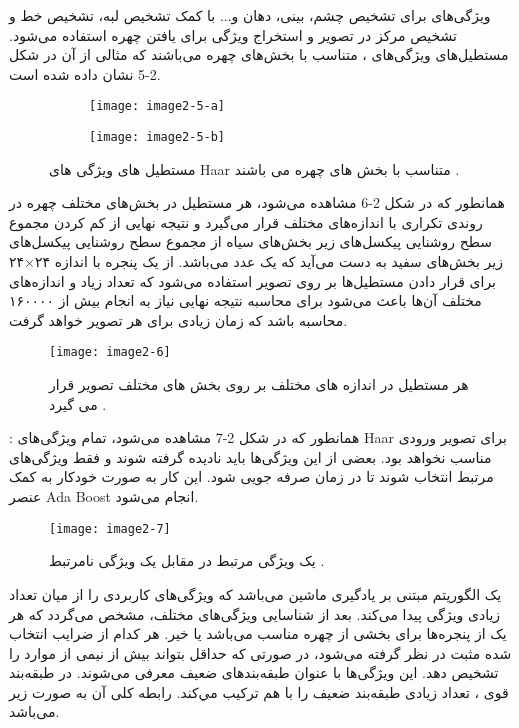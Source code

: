 \noindent
ویژگی‌های‌  برای تشخیص چشم، بینی، دهان و... با کمک تشخیص لبه، تشخیص خط و تشخیص مرکز در تصویر و استخراج ویژگی برای یافتن چهره استفاده می‌شود. مستطیل‌های ویژگی‌های ، متناسب با بخش‌های چهره می‌باشند که مثالی از آن در شکل 2-5 نشان داده شده است.

\begin{figure}
\begin{subfigure}{.5\textwidth}
  \centering
  \texttt{[image: image2-5-a]}
  \label{image2-5-a}
\end{subfigure}
\begin{subfigure}{.5\textwidth}
  \centering
  \texttt{[image: image2-5-b]}
  \label{image2-5-b}
\end{subfigure}
\caption{مستطیل های ویژگی های Haar متناسب با بخش های چهره می باشند \cite{ref1}.}
\label{fig:image2-5}
\end{figure}

\noindent
همانطور که در شکل 2-6 مشاهده می‌شود، هر مستطیل در بخش‌های مختلف چهره در روندی تکراری با اندازه‌های مختلف قرار می‌گیرد و نتیجه نهایی از کم کردن مجموع سطح روشنایی پیکسل‌های زیر بخش‌های سیاه از مجموع سطح روشنایی پیکسل‌های زیر بخش‌های سفید به دست می‌آید که یک عدد می‌باشد. از یک پنجره با اندازه ۲۴×۲۴ برای قرار دادن مستطیل‌ها بر روی تصویر استفاده می‌شود که تعداد زیاد و اندازه‌های مختلف آن‌ها باعث می‌شود برای محاسبه نتیجه نهایی نیاز به انجام بیش از ۱۶۰۰۰۰ محاسبه باشد که زمان زیادی برای هر تصویر خواهد گرفت.

\begin{figure}[h]
\centering
  \texttt{[image: image2-6]}
  \caption{هر مستطیل در اندازه های مختلف بر روی بخش های مختلف تصویر قرار می گیرد \cite{ref1}.}
  \label{image2-6}
\end{figure}

\noindent
{}: 
همانطور که در شکل 2-7 مشاهده می‌شود، تمام ویژگی‌های Haar برای تصویر ورودی مناسب نخواهد بود. بعضی از این ویژگی‌ها باید نادیده گرفته شوند و فقط ویژگی‌های مرتبط انتخاب شوند تا در زمان صرفه جویی شود. این کار به صورت خودکار به کمک عنصر Ada Boost انجام می‌شود.
\begin{figure}[h]
\centering
  \texttt{[image: image2-7]}
  \caption{یک ویژگی مرتبط در مقابل یک ویژگی نامرتبط \cite{ref1}.}
  \label{image2-7}
\end{figure}

\noindent
{} 
یک الگوریتم مبتنی بر یادگیری ماشین می‌باشد که ویژگی‌های کاربردی را از میان تعداد زیادی ویژگی پیدا می‌کند. بعد از شناسایی ویژگی‌های مختلف، مشخص می‌گردد که هر یک از پنجره‌ها برای بخشی از چهره مناسب می‌باشد یا خیر. هر کدام از ضرایب انتخاب شده مثبت در نظر گرفته می‌شود، در صورتی که حداقل بتواند بیش از نیمی از موارد را تشخیص دهد. این ویژگی‌ها با عنوان طبقه‌بندهای ضعیف  معرفی می‌شوند. 
در طبقه‌بند قوی ، تعداد زيادی طبقه‌بند ضعيف را با هم ترکيب مي‌کند. رابطه کلی آن به صورت زیر می‌باشد.

